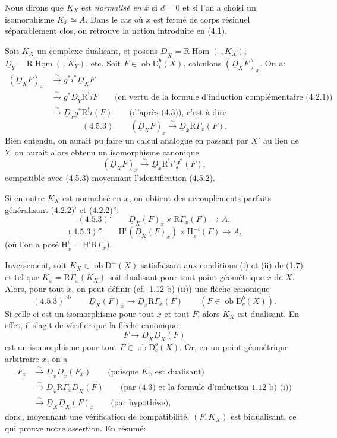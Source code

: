 \documentclass[11pt]{article}
\providecommand{\uH}{\underline{\mathrm H}}
\DeclareMathOperator{\Hom}{Hom}
\newcommand{\R}{\mathrm{R}}
\newcommand{\D}{\mathrm{D}}
\newcommand{\ob}{\operatorname{ob}}
\newcommand{\ol}[1]{\overline{#1}}
\providecommand{\Hom}{\operatorname{Hom}}
\providecommand{\ob}{\operatorname{ob}}
\providecommand{\R}{\mathrm R}
\providecommand{\Hom}{\operatorname{Hom}}
\begin{document}
Nous dirons que $K_X$ est \emph{normalisé en $\ol{x}$} si $d=0$ et si l'on a choisi un isomorphisme $K_{\ol{x}}\simeq A$. Dans le cas où $x$ est fermé de corps résiduel séparablement clos, on retrouve la notion introduite en (4.1).

Soit $K_X$ un complexe dualisant, et posons $\underline{D}_X=\R\underline{\Hom}(\ ,K_X)$; $\underline{D}_Y=\R\underline{\Hom}(\ ,K_Y)$, etc. Soit $F\in\ob\D_c^b(X)$, calculons $(\underline{D}_XF)_{\ol{x}}$. On a:
\[
\begin{aligned}
(\underline{D}_XF)_{\ol{x}}&\xrightarrow{\sim}g^*i^*\underline{D}_X F\\
&\xrightarrow{\sim}g^*\underline{D}_Y\R^{!}iF\qquad\text{(en vertu de la formule d'induction complémentaire (4.2.1))}\\
&\xrightarrow{\sim}\underline{D}_{\ol{x}}g^*\R^{!}i(F)\qquad\text{(d'après (4.3)), c'est-à-dire}
\end{aligned}
\]
\[
(4.5.3)\qquad (\underline{D}_X F)_{\ol{x}}\xrightarrow{\sim}\underline{D}_{\ol{x}}\R\Gamma_{\ol{x}}(F).
\]
Bien entendu, on aurait pu faire un calcul analogue en passant par $X'$ au lieu de $Y$, on aurait alors obtenu un isomorphisme canonique
\[
(\underline{D}_XF)_{\ol{x}}\xrightarrow{\sim}\underline{D}_{\ol{x}}\R^{!}i'f^*(F),
\]
compatible avec (4.5.3) moyennant l'identification (4.5.2).

Si en outre $K_X$ est normalisé en $\ol{x}$, on obtient des accouplements parfaits généralisant (4.2.2)' et (4.2.2)'':
\[
(4.5.3)'\qquad \underline{D}_X(F)_{\ol{x}}\times \R\Gamma_{\ol{x}}(F)\longrightarrow A,
\]
\[
(4.5.3)''\qquad \uH^i(\underline{D}_X(F)_{\ol{x}})\times \uH_{\ol{x}}^{-i}(F)\longrightarrow A,
\]
(où l'on a posé $\uH_{\ol{x}}^i=\uH^i\R\Gamma_{\ol{x}}$).

Inversement, soit $K_X\in\ob\D^+(X)$ satisfaisant aux conditions (i) et (ii) de (1.7) et tel que $K_{\ol{x}}=\R\Gamma_{\ol{x}}(K_X)$ soit dualisant pour tout point géométrique $\ol{x}$ de $X$. Alors, pour tout $\ol{x}$, on peut définir (cf.~1.12 b) (ii)) une flèche canonique
\[
(4.5.3)^{\mathrm{bis}}\qquad \underline{D}_X(F)_{\ol{x}}\longrightarrow \underline{D}_{\ol{x}}\R\Gamma_{\ol{x}}(F)\qquad (F\in\ob\D_c^b(X)).
\]
Si celle-ci est un isomorphisme pour tout $\ol{x}$ et tout $F$, alors $K_X$ est dualisant. En effet, il s'agit de vérifier que la flèche canonique
\[
F\longrightarrow \underline{D}_X\underline{D}_X(F)
\]
est un isomorphisme pour tout $F\in\ob\D_c^b(X)$. Or, en un point géométrique arbitraire $\ol{x}$, on a
\[
\begin{aligned}
F_{\ol{x}}&\xrightarrow{\sim}\underline{D}_{\ol{x}}\underline{D}_{\ol{x}}(F_{\ol{x}})\qquad\text{(puisque $K_{\ol{x}}$ est dualisant)}\\
&\xrightarrow{\sim}\underline{D}_{\ol{x}}\R\Gamma_{\ol{x}}\underline{D}_X(F)\qquad\text{(par (4.3) et la formule d'induction 1.12 b) (i))}\\
&\xrightarrow{\sim}\underline{D}_X\underline{D}_X(F)_{\ol{x}}\qquad\text{(par hypothèse)},
\end{aligned}
\]
donc, moyennant une vérification de compatibilité, $(F,K_X)$ est bidualisant, ce qui prouve notre assertion. En résumé:
\end{document}
